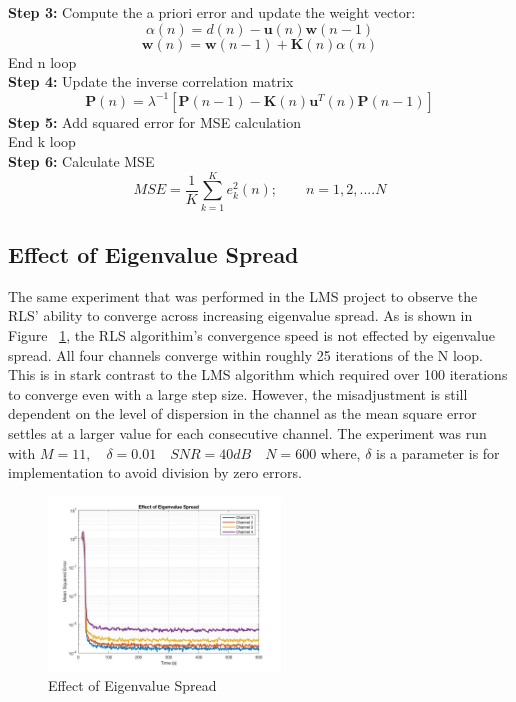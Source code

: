 \documentclass[journal]{IEEEtran}
\begin{document}
\indent \textbf{Step 3:} Compute the a priori error and update the weight vector:
\begin{equation}
  \alpha(n) = d(n) - \boldsymbol{u}(n)\boldsymbol{w}(n-1)
\end{equation}
\begin{equation}
  \boldsymbol{w}(n)= \boldsymbol{w}(n-1)+\boldsymbol{K}(n)\alpha(n)
\end{equation}
End n loop\\
\indent \textbf{Step 4:} Update the inverse correlation matrix
\begin{equation}
  \boldsymbol{P}(n)= \lambda^{-1}[\boldsymbol{P}(n-1)-\boldsymbol{K}(n)\boldsymbol{u}^T(n)\boldsymbol{P}(n-1)]
\end{equation}
\textbf{Step 5:} Add squared error for MSE calculation\\
End k loop\\
\textbf{Step 6:} Calculate MSE
\begin{equation}
  \label{eq:MSE}
  MSE=\dfrac{1}{K}\sum_{k=1}^{K}e_k^2(n); \qquad n = 1,2,....N
\end{equation}
\subsection{Effect of Eigenvalue Spread}
The same experiment that was performed in the LMS project to observe the RLS' ability to
converge across increasing eigenvalue spread. As is shown in Figure ~\ref{fig:eigenspread2},
the RLS algorithim's convergence speed is not effected by eigenvalue spread. All four channels converge
within roughly 25 iterations of the N loop. This is in stark contrast to the LMS algorithm which
required over 100 iterations to converge even with a large step size. However, the misadjustment is still dependent on
the level of dispersion in the channel as the mean square error settles at a larger value for each consecutive channel. The experiment was run
with $M = 11, \quad \delta = 0.01 \quad SNR = 40dB \quad N = 600$ where, $\delta$ is a parameter is for implementation
to avoid division by zero errors.
\begin{figure}[H]
  \centering
  \captionsetup{justification=centering,font = small}
  \includegraphics[width=0.55\textwidth, inner] {Plots/Project2_eigenspread.jpg}
  \caption{Effect of Eigenvalue Spread}
    \label{fig:eigenspread2}
\end{figure}
\end{document}
